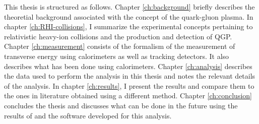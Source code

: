 This thesis is structured as follows. Chapter \ref{ch:background} briefly describes the theoretial background associated with the concept of the quark-gluon plasma. In chapter \ref{ch:RHI-collisions}, I summarize the experimental concepts pertaining to relativistic heavy-ion collisions and the production and detection of QGP. Chapter \ref{ch:measurement} consists of the formalism of the measurement of transverse energy using calorimeters as well as tracking detectors. It also describes what has been done using calorimeters. Chapter \ref{ch:analysis} describes the data used to perform the analysis in this thesis and notes the relevant details of the analysis. In chapter \ref{ch:results}, I present the results and compare them to the ones in literature obtained using a different method. Chapter \ref{ch:conclusion} concludes the thesis and discusses what can be done in the future using the results of and the software developed for this analysis.
